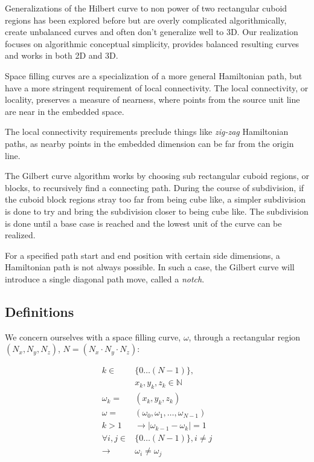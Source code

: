 Generalizations of the Hilbert curve to non power of two rectangular cuboid regions
has been explored before but are overly complicated algorithmically, create unbalanced
curves and often don't generalize well to 3D.
Our realization focuses on algorithmic conceptual simplicity, provides balanced
resulting curves and works in both 2D and 3D.

Space filling curves are a specialization of a more general Hamiltonian path,
but have a more stringent requirement of local connectivity.
The local connectivity, or locality, preserves a measure of nearness, where
points from the source unit line are near in the embedded space.

The local connectivity requirements
preclude things like \textit{zig-zag} Hamiltonian
paths, as nearby points in the embedded dimension can be far from the origin line.



The Gilbert curve algorithm works by choosing sub rectangular cuboid regions, or blocks,
to recursively find a connecting path.
During the course of subdivision, if the cuboid block regions stray too far from being
cube like, a simpler subdivision is done to try and bring the subdivision closer to being
cube like.
The subdivision is done until a base case is reached and the lowest unit of the curve
can be realized.

For a specified path start and end position with certain side dimensions, a Hamiltonian
path is not always possible.
In such a case, the Gilbert curve will introduce a single diagonal path move, called a \textit{notch}.


\subsection{Definitions}

We concern ourselves with a space filling curve, $\omega$, through a rectangular region $( N _ x, N _ y, N _ z)$,  $N = (N _ x \cdot N _ y \cdot N _ z)$:


$$
\begin{array}{rl}
  k \in & \{ 0 \dots (N-1) \}, \\
  & x _ k, y _ k, z _ k \in \mathbb{N} \\
  \omega _ k = & ( x _ k, y _ k, z _ k ) \\
  \omega = & ( \omega _ 0, \omega _ 1, \dots, \omega _ {N-1} ) \\
  k>1  & \to | \omega _ {k - 1} - \omega _ {k} | = 1 \\
  \forall i,j \in & \{ 0 \dots (N-1) \}, i \ne j  \\
  \to & \omega _ i \ne \omega _ j
\end{array}
$$


